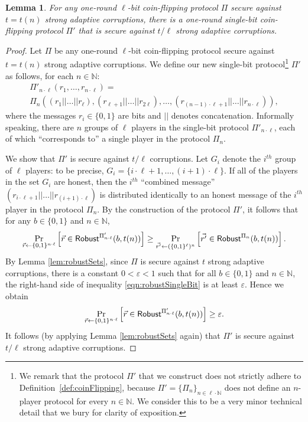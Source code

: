 \documentclass[11pt,letterpaper]{article}
\theoremstyle{plain}
\newtheorem{lemma}[theorem]{Lemma}
\theoremstyle{definition}
\newcommand{\NN}{\mathbb{N}}
\newcommand{\larr}{\leftarrow}
\newcommand{\eps}{\varepsilon}
\begin{document}
\begin{lemma}\label{lem:multiToOneBit_strong}
For any one-round $\ell$-bit coin-flipping protocol $\Pi$ secure against $t=t(n)$ strong adaptive corruptions, 
there is a one-round single-bit coin-flipping protocol $\Pi'$ that is secure against $t/\ell$ strong adaptive corruptions.
\end{lemma}
\begin{proof}
Let $\Pi$ be any one-round $\ell$-bit coin-flipping protocol secure against $t=t(n)$ strong adaptive corruptions.
We define our new single-bit protocol\footnote{We remark that the protocol $\Pi'$ that we construct does not strictly adhere to
Definition~\ref{def:coinFlipping}, because $\Pi'=\{\Pi_n\}_{n\in\ell\cdot\NN}$ does not define an $n$-player protocol for every $n\in\NN$.
We consider this to be a very minor technical detail that we bury for clarity of exposition.
} $\Pi'$ as follows, for each $n\in\NN$:
\begin{gather*}
\Pi'_{n\cdot\ell}(r_1,\dots,r_{n\cdot\ell})= \\
\Pi_n\left((r_1||\dots||r_\ell), (r_{\ell+1}||\dots||r_{2\ell}), \dots, (r_{(n-1)\cdot\ell+1}||\dots||r_{n\cdot\ell})\right),
\end{gather*}
where the messages $r_i\in\{0,1\}$ are bits and $||$ denotes concatenation.
Informally speaking, there are $n$ groups of $\ell$ players in the single-bit protocol $\Pi'_{n\cdot\ell}$, each of which
``corresponds to'' a single player in the protocol $\Pi_n$.

We show that $\Pi'$ is secure against $t/\ell$ corruptions.
Let $G_i$ denote the $i^{th}$ group of $\ell$ players: to be precise, $G_i=\{i\cdot\ell+1,\dots,(i+1)\cdot\ell\}$.
If all of the players in the set $G_i$ are honest, then the $i^{th}$ ``combined message'' $(r_{i\cdot\ell+1}||\dots||r_{(i+1)\cdot\ell})$
is distributed identically to an honest message of the $i^{th}$ player in the protocol $\Pi_n$.
By the construction of the protocol $\Pi'$, it follows that for any $b\in\{0,1\}$ and $n\in\NN$,
\begin{align}\label{eqn:robustSingleBit}
\Pr_{\vec{r}\larr\{0,1\}^{n\cdot\ell}}\left[\vec{r}\in\Robust^{\Pi'_{n\cdot\ell}}(b,t(n))\right]\geq
\Pr_{\vec{r'}\larr(\{0,1\}^\ell)^n}\left[\vec{r'}\in\Robust^{\Pi_n}(b,t(n))\right].
\end{align}
By Lemma \ref{lem:robustSets}, since $\Pi$ is secure against $t$ strong adaptive corruptions,
there is a constant $0<\eps<1$ such that for all $b\in\{0,1\}$ and $n\in\NN$, the right-hand side of inequality \eqref{eqn:robustSingleBit}
is at least $\eps$. Hence we obtain
$$
\Pr_{\vec{r}\larr\{0,1\}^{n\cdot\ell}}\left[\vec{r}\in\Robust^{\Pi'_{n\cdot\ell}}(b,t(n))\right]\geq\eps.
$$
It follows (by applying Lemma \ref{lem:robustSets} again) that $\Pi'$ is secure against $t/\ell$ strong adaptive corruptions.
\end{proof}
\end{document}
